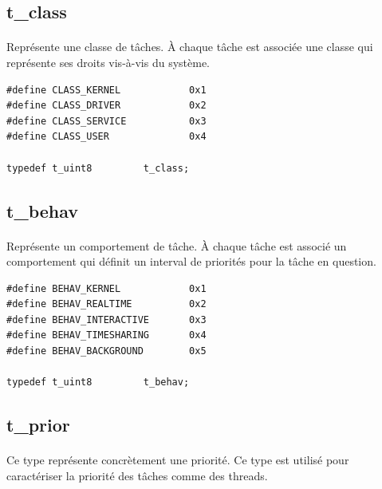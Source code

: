 \documentclass[10pt,a4wide]{article}
\begin{document}
\subsection{t\_class}

\paragraph{}

Repr\'esente une classe de t\^aches. \`A chaque t\^ache est associ\'ee une
classe qui repr\'esente ses droits vis-\`a-vis du syst\`eme.

\begin{verbatim}
#define CLASS_KERNEL            0x1
#define CLASS_DRIVER            0x2
#define CLASS_SERVICE           0x3
#define CLASS_USER              0x4

typedef t_uint8         t_class;
\end{verbatim}

\subsection{t\_behav}

\paragraph{}

Repr\'esente un comportement de t\^ache. \`A chaque t\^ache est associ\'e
un comportement qui d\'efinit un interval de priorit\'es pour la t\^ache
en question.

\begin{verbatim}
#define BEHAV_KERNEL            0x1
#define BEHAV_REALTIME          0x2
#define BEHAV_INTERACTIVE       0x3
#define BEHAV_TIMESHARING       0x4
#define BEHAV_BACKGROUND        0x5

typedef t_uint8         t_behav;
\end{verbatim}

\subsection{t\_prior}

\paragraph{}

Ce type repr\'esente concr\`etement une priorit\'e. Ce type est utilis\'e
pour caract\'eriser la priorit\'e des t\^aches comme des threads.
\end{document}
